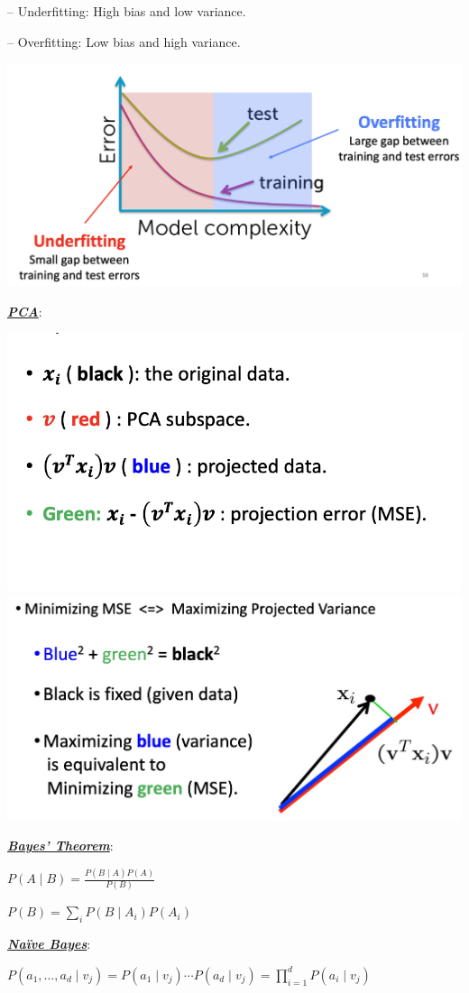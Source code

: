 \documentclass[12pt]{article}
\newcommand{\bulletPoint}[1]{\ul{\textit{\textbf{#1}}}}
\begin{document}
\begin{multicols*}{2}
– Underfitting: High bias and low variance. 

– Overfitting: Low bias and high variance. 

\includegraphics[scale=0.235]{images/over-under-fitting.png}


\bulletPoint{PCA}:

\includegraphics[scale=0.35]{images/PCA1.png}
\includegraphics[scale=0.26]{images/PCA2.png}


\bulletPoint{Bayes’ Theorem}:

$ P(A \mid B) = \frac{P(B \mid A) P(A)}{P(B)}  $

$ P(B) = \sum_i P(B \mid A_i) P(A_i) $

\bulletPoint{Naïve Bayes}:

$ P(a_1, \dots, a_d \mid v_j) = P(a_1 \mid v_j) \cdots P(a_d \mid v_j)  = \prod_{i=1}^d P(a_i \mid v_j) $


\end{multicols*}
\end{document}
